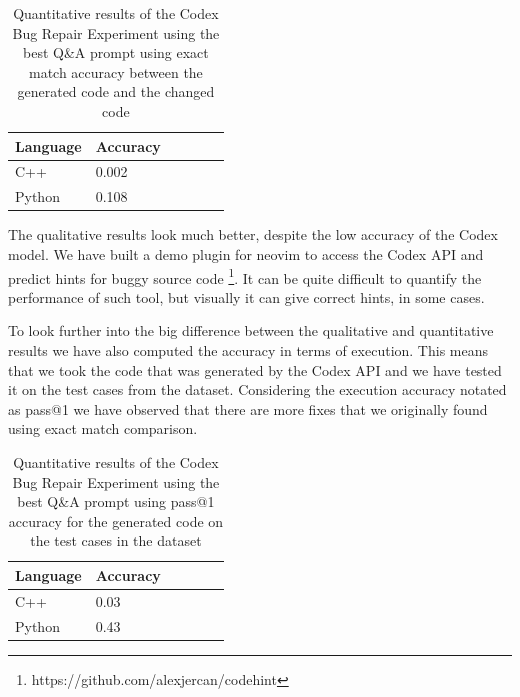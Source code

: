\documentclass[12pt,a4paper]{report}
\begin{document}
\begin{table}[H]\small\linespread{1}
\centering
\caption{Quantitative results of the Codex Bug Repair Experiment using the best Q\&A prompt using exact match accuracy between the generated code and the changed code}
\label{tab:codex1}
\begin{tabular}{p{4cm} l >{\raggedright\arraybackslash}p{2cm} >{\raggedright\arraybackslash}p{2cm} >{\raggedright\arraybackslash}p{2cm} >{\raggedright\arraybackslash}p{2cm}}
\textbf{Language} & \textbf{Accuracy} \\
\hline
C++                                 & 0.002 \\
\hline
Python                              & 0.108 \\
\end{tabular}
\end{table}

The qualitative results look much better, despite the low accuracy of the Codex model. We have built a demo plugin for neovim to access the Codex API and predict hints for buggy source code \footnote{https://github.com/alexjercan/codehint}. It can be quite difficult to quantify the performance of such tool, but visually it can give correct hints, in some cases.

To look further into the big difference between the qualitative and quantitative results we have also computed the accuracy in terms of execution. This means that we took the code that was generated by the Codex API and we have tested it on the test cases from the dataset. Considering the execution accuracy notated as pass@1 we have observed that there are more fixes that we originally found using exact match comparison. 

\begin{table}[H]\small\linespread{1}
\centering
\caption{Quantitative results of the Codex Bug Repair Experiment using the best Q\&A prompt using pass@1 accuracy for the generated code on the test cases in the dataset}
\label{tab:codex2}
\begin{tabular}{p{4cm} l >{\raggedright\arraybackslash}p{2cm} >{\raggedright\arraybackslash}p{2cm} >{\raggedright\arraybackslash}p{2cm} >{\raggedright\arraybackslash}p{2cm}}
\textbf{Language} & \textbf{Accuracy} \\
\hline
C++                                 & 0.03 \\
\hline
Python                              & 0.43 \\
\end{tabular}
\end{table}
\end{document}
